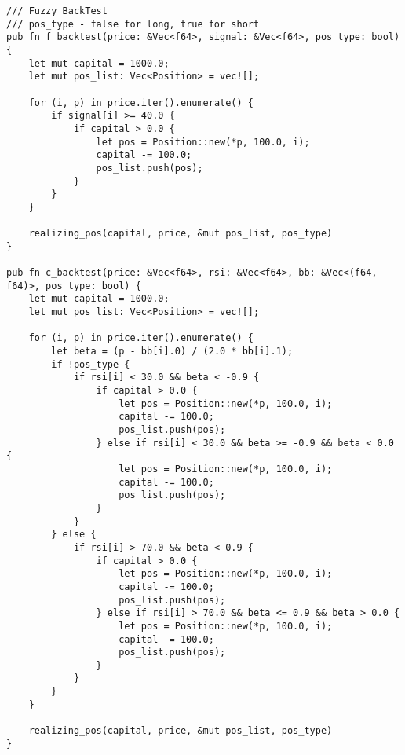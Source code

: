 \begin{verbatim}
/// Fuzzy BackTest
/// pos_type - false for long, true for short
pub fn f_backtest(price: &Vec<f64>, signal: &Vec<f64>, pos_type: bool) {
    let mut capital = 1000.0;
    let mut pos_list: Vec<Position> = vec![];

    for (i, p) in price.iter().enumerate() {
        if signal[i] >= 40.0 {
            if capital > 0.0 {
                let pos = Position::new(*p, 100.0, i);
                capital -= 100.0;
                pos_list.push(pos);
            }
        }
    }

    realizing_pos(capital, price, &mut pos_list, pos_type)
}

pub fn c_backtest(price: &Vec<f64>, rsi: &Vec<f64>, bb: &Vec<(f64, f64)>, pos_type: bool) {
    let mut capital = 1000.0;
    let mut pos_list: Vec<Position> = vec![];

    for (i, p) in price.iter().enumerate() {
        let beta = (p - bb[i].0) / (2.0 * bb[i].1);
        if !pos_type {
            if rsi[i] < 30.0 && beta < -0.9 {
                if capital > 0.0 {
                    let pos = Position::new(*p, 100.0, i);
                    capital -= 100.0;
                    pos_list.push(pos);
                } else if rsi[i] < 30.0 && beta >= -0.9 && beta < 0.0 {
                    let pos = Position::new(*p, 100.0, i);
                    capital -= 100.0;
                    pos_list.push(pos);
                }
            }
        } else {
            if rsi[i] > 70.0 && beta < 0.9 {
                if capital > 0.0 {
                    let pos = Position::new(*p, 100.0, i);
                    capital -= 100.0;
                    pos_list.push(pos);
                } else if rsi[i] > 70.0 && beta <= 0.9 && beta > 0.0 {
                    let pos = Position::new(*p, 100.0, i);
                    capital -= 100.0;
                    pos_list.push(pos);
                }
            }
        }
    }

    realizing_pos(capital, price, &mut pos_list, pos_type)
}
\end{verbatim}